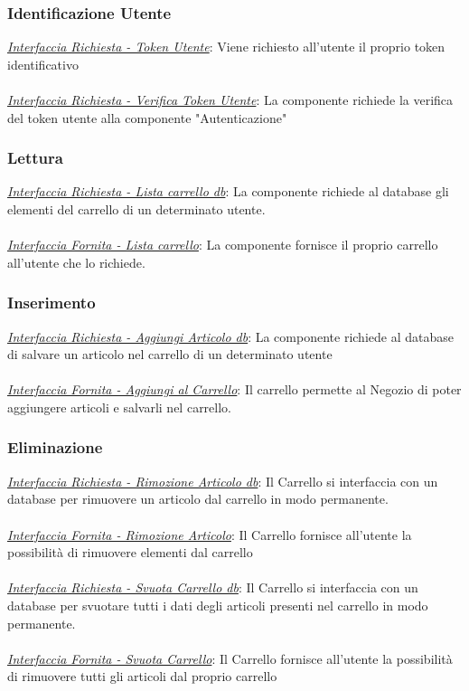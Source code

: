 \documentclass{report}
\begin{document}
\subsubsection*{\indent \indent Identificazione Utente}
\uline{\textit{Interfaccia Richiesta - Token Utente}}: 
Viene richiesto all'utente il proprio token identificativo\\ \\
\uline{\textit{Interfaccia Richiesta - Verifica Token Utente}}: 
La componente richiede la verifica del token utente alla componente "Autenticazione"
\subsubsection*{\indent \indent Lettura}
\uline{\textit{Interfaccia Richiesta - Lista carrello db}}: 
La componente richiede al database gli elementi del carrello di un determinato utente. \\\\
\uline{\textit{Interfaccia Fornita - Lista carrello}}: 
La componente fornisce il proprio carrello all'utente che lo richiede.
\subsubsection*{\indent \indent Inserimento}
\uline{\textit{Interfaccia Richiesta - Aggiungi Articolo db}}:
 La componente richiede al database di salvare un articolo nel carrello di un determinato utente\\\\ 
\uline{\textit{Interfaccia Fornita - Aggiungi al Carrello}}: 
Il carrello permette al Negozio di poter aggiungere articoli e salvarli nel carrello.
\subsubsection*{\indent \indent Eliminazione}
\uline{\textit{Interfaccia Richiesta - Rimozione Articolo db}}: 
Il Carrello si interfaccia con un database per rimuovere un articolo dal carrello in modo permanente.\\ \\
\uline{\textit{Interfaccia Fornita - Rimozione Articolo}}: 
Il Carrello fornisce all'utente la possibilità di rimuovere elementi dal carrello\\\\
\uline{\textit{Interfaccia Richiesta - Svuota Carrello db}}: 
Il Carrello si interfaccia con un database per svuotare tutti i dati degli articoli presenti nel carrello in modo permanente.\\ \\
\uline{\textit{Interfaccia Fornita - Svuota Carrello}}:
Il Carrello fornisce all'utente la possibilità di rimuovere tutti gli articoli dal proprio carrello
\end{document}
